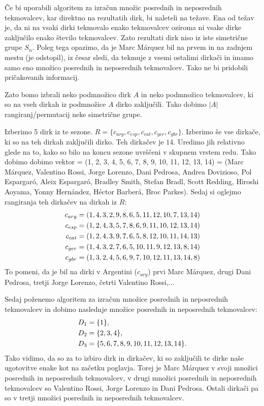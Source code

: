 \documentclass[a4paper, 12pt]{book}
\begin{document}
Če bi uporabili algoritem za izračun množic posrednih in neposrednih tekmovalcev, kar direktno na rezultatih dirk, bi naleteli na težave. Ena od težav je, da ni na vsaki dirki tekmovalo enako tekmovalcev oziroma ni vsake dirke zaključilo enako število tekmovalcev. Zato rezultati dirk niso iz iste simetrične grupe $S_n$. Poleg tega opazimo, da je Marc Márquez bil na prvem in na zadnjem mestu (je odstopil), iz česar sledi, da tekmuje z vsemi ostalimi dirkači in imamo samo eno množico posrednih in neposrednih tekmovalcev. Tako ne bi pridobili pričakovanih informacij.

Zato bomo izbrali neko podmnožico dirk $A$ in neko podmnožico tekmovalcev, ki so na vseh dirkah iz podmnožice $A$ dirko zaključili. Tako dobimo $|A|$ rangiranj/permutacij neke simetrične grupe.

Izberimo 5 dirk iz te sezone. $R = \{ c_{arg}, c_{esp}, c_{cat}, c_{ger}, c_{gbr} \}$. Izberimo še vse dirkače, ki so na teh dirkah zaključili dirko. Teh dirkačev je $14$. Uredimo jih relativno glede na to, kako so bilo na koncu sezone uvrščeni v skupnem vrstem redu. Tako dobimo dobimo vektor = (1, 2, 3, 4, 5, 6, 7, 8, 9, 10, 11, 12, 13, 14) = (Marc Márquez, Valentino Rossi, Jorge Lorenzo, Dani Pedrosa, Andrea Dovizioso, Pol Espargaró, Aleix Espargaró, Bradley Smith, Stefan Bradl, Scott Redding, Hiroshi Aoyama, Yonny Hernández, Héctor Barberá, Broc Parkes). Sedaj si oglejmo rangiranja teh dirkačev na dirkah iz $R$:
\begin{align}
    c_{arg} &= (1, 4, 3, 2, 9, 8, 6, 5, 11, 12, 10, 7, 13, 14) \notag\\
    c_{esp} &= (1, 2, 4, 3, 5, 7, 8, 6, 9, 11, 10, 12, 13, 14) \notag\\
    c_{cat} &= (1, 2, 4, 3, 9, 7, 6, 5, 8, 12, 10, 11, 14, 13) \notag\\
    c_{ger} &= (1, 4, 3, 2, 7, 6, 5, 10, 11, 9, 12, 13, 8, 14) \notag\\
    c_{gbr} &= (1, 3, 2, 4, 5, 6, 9, 7, 10, 12, 11, 13, 14, 8) \notag
\end{align}
To pomeni, da je bil na dirki v Argentini ($c_{arg}$) prvi Marc Márquez, drugi Dani Pedrosa, tretji Jorge Lorenzo, četrti Valentino Rossi,...

Sedaj poženemo algoritem za izračun množice posrednih in neposrednih tekmovalcev in dobimo naslednje množice posrednih in neposrednih tekmovalcev:
\begin{align}
    D_1 &= \{ 1 \},  \notag\\
    D_2 &= \{ 2, 3, 4 \}, \notag\\
    D_3 &= \{ 5, 6, 7, 8, 9, 10, 11, 12, 13, 14 \}. \notag
\end{align}
Tako vidimo, da so za to izbiro dirk in dirkačev, ki so zaključili te dirke naše ugotovitve enake kot na začetku poglavja. Torej je Marc Márquez v svoji množici posrednih in neposrednih tekmovalcev, v drugi množici posrednih in neposrednih tekmovalcev so Valentino Rossi, Jorge Lorenzo in Dani Pedrosa. Ostali dirkači pa so v tretji množici posrednih in neposrednih tekmovalcev.
\end{document}
